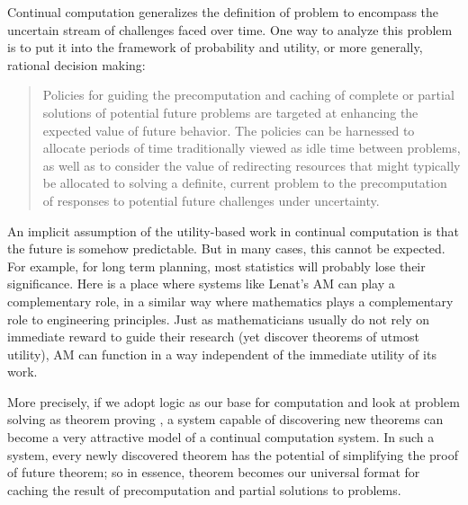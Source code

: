 Continual computation generalizes the definition of problem to encompass
the uncertain stream of challenges faced over time.  One way to analyze
this problem is to put it into the framework of probability and utility, or
more generally, rational decision making:
\begin{quotation} Policies for guiding the precomputation and caching of
  complete or partial solutions of potential future problems are targeted
  at enhancing the expected value of future behavior.  The policies can be
  harnessed to allocate periods of time traditionally viewed as idle time
  between problems, as well as to consider the value of redirecting
  resources that might typically be allocated to solving a definite,
  current problem to the precomputation of responses to potential future
  challenges under uncertainty\cite{horvitz2001:principles}.  
\end{quotation}

An implicit assumption of the utility-based work in continual computation
is that the future is somehow predictable.  But in many cases, this cannot
be expected.  For example, for long term planning, most statistics will
probably lose their significance.  Here is a place where systems like
Lenat's AM can play a complementary role, in a similar way where
mathematics plays a complementary role to engineering principles.  Just as
mathematicians usually do not rely on immediate reward to guide their
research (yet discover theorems of utmost utility), AM can function in a
way independent of the immediate utility of its work.  

More precisely, if we adopt logic as our base for computation and look at
problem solving as theorem proving \cite{?}, a system capable of
discovering new theorems can become a very attractive model of a continual
computation system.  In such a system, every newly discovered theorem has
the potential of simplifying the proof of future theorem; so in essence,
theorem becomes our universal format for caching the result of
precomputation and partial solutions to problems.  


